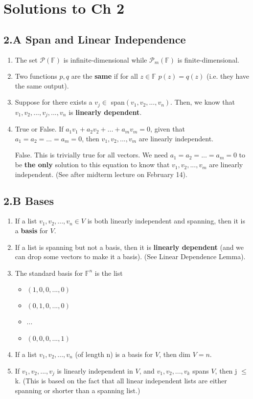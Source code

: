 \documentclass[11pt]{article}
\begin{document}
\section*{Solutions to Ch 2}
\subsection*{2.A Span and Linear Independence}
\begin{enumerate}
	\item The set $\mathcal{P}(\mathbb{F})$ is infinite-dimensional while $\mathcal{P}_m(\mathbb{F})$ is finite-dimensional.
	
	\item Two functions $p, q$ are the \textbf{same} if for all $z \in \mathbb{F}$ $p(z) = q(z)$ (i.e. they have the same output).
	
	\item Suppose for there exists a $v_j \in$ span$(v_1, v_2, ..., v_n)$. Then, we know that $v_1, v_2, ..., v_j, ..., v_n$ is \textbf{linearly dependent}.
	
	\item True or False. If $a_1v_1 + a_2v_2 + ... + a_mv_m = 0$, given that $a_1 = a_2 = ... = a_m = 0$, then $v_1, v_2, ..., v_m$ are linearly independent.
	
	\bigskip
	
	False. This is trivially true for all vectors. We need $a_1 = a_2 = ... = a_m = 0$ to be \textbf{the only} solution to this equation to know that $v_1, v_2, ..., v_m$ are linearly independent. (See after midterm lecture on February 14).
\end{enumerate}

\subsection*{2.B Bases}
\begin{enumerate}
	\item If a list $v_1, v_2, ..., v_n \in V$ is both linearly independent and spanning, then it is a \textbf{basis} for $V$.
	\item If a list is spanning but not a basis, then it is \textbf{linearly dependent} (and we can drop some vectors to make it a basis). (See Linear Dependence Lemma).
	\item The standard basis for $\mathbb{F}^n$ is the list 
	\begin{itemize}
		\item $(1, 0, 0, ..., 0)$
		\item $(0, 1, 0, ..., 0)$
		\item ...
		\item $(0, 0, 0, ..., 1)$
	\end{itemize}
	\item If a list $v_1, v_2, ..., v_n$ (of length n) is a basis for $V$, then dim $V = n$.
	\item If $v_1, v_2, ..., v_j$ is linearly independent in $V$, and $v_1, v_2, ..., v_k$ spans $V$, then j $\leq$ k. (This is based on the fact that all linear independent lists are either spanning or shorter than a spanning list.)
\end{enumerate}
\end{document}
